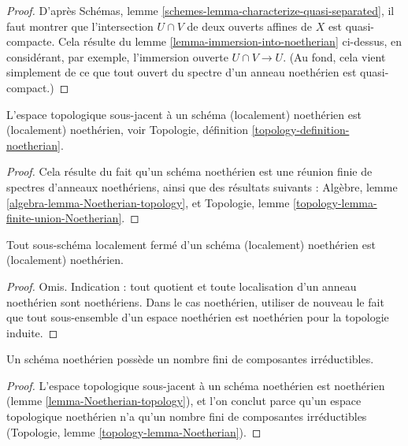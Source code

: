 \begin{proof}
D'après Schémas, lemme \ref{schemes-lemma-characterize-quasi-separated},
il faut montrer que l'intersection $U \cap V$ de deux
ouverts affines de $X$ est quasi-compacte. Cela résulte du
lemme \ref{lemma-immersion-into-noetherian} ci-dessus, en
considérant, par exemple, l'immersion ouverte $U \cap V \to U$.
(Au fond, cela vient simplement de ce que tout ouvert du spectre d'un
anneau noethérien est quasi-compact.)
\end{proof}

\begin{lemma}
\label{lemma-Noetherian-topology}
L'espace topologique sous-jacent à un schéma (localement) noethérien
est (localement) noethérien,
voir Topologie, définition \ref{topology-definition-noetherian}.
\end{lemma}

\begin{proof}
Cela résulte du fait qu'un schéma noethérien est une réunion finie de spectres
d'anneaux noethériens, ainsi que des résultats suivants :
Algèbre, lemme \ref{algebra-lemma-Noetherian-topology}, et
Topologie, lemme \ref{topology-lemma-finite-union-Noetherian}.
\end{proof}

\begin{lemma}
\label{lemma-locally-closed-in-Noetherian}
Tout sous-schéma localement fermé d'un schéma (localement) noethérien
est (localement) noethérien.
\end{lemma}

\begin{proof}
Omis. Indication : tout quotient et toute localisation d'un anneau
noethérien sont noethériens. Dans le cas noethérien, utiliser de nouveau
le fait que tout sous-ensemble d'un espace noethérien est noethérien
pour la topologie induite.
\end{proof}

\begin{lemma}
\label{lemma-Noetherian-irreducible-components}
Un schéma noethérien possède un nombre fini de composantes irréductibles.
\end{lemma}

\begin{proof}
L'espace topologique sous-jacent à un schéma noethérien est noethérien
(lemme \ref{lemma-Noetherian-topology}),
et l'on conclut parce qu'un espace topologique noethérien
n'a qu'un nombre fini de composantes irréductibles
(Topologie, lemme \ref{topology-lemma-Noetherian}).
\end{proof}

